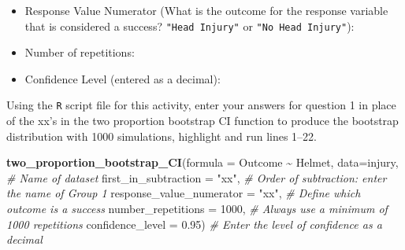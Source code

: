 \documentclass[
]{report}
\newenvironment{Shaded}{\begin{snugshade}}{\end{snugshade}}
\newcommand{\CommentTok}[1]{\textcolor[rgb]{0.56,0.35,0.01}{\textit{#1}}}
\newcommand{\DataTypeTok}[1]{\textcolor[rgb]{0.13,0.29,0.53}{#1}}
\newcommand{\DecValTok}[1]{\textcolor[rgb]{0.00,0.00,0.81}{#1}}
\newcommand{\FloatTok}[1]{\textcolor[rgb]{0.00,0.00,0.81}{#1}}
\newcommand{\KeywordTok}[1]{\textcolor[rgb]{0.13,0.29,0.53}{\textbf{#1}}}
\newcommand{\NormalTok}[1]{#1}
\newcommand{\OperatorTok}[1]{\textcolor[rgb]{0.81,0.36,0.00}{\textbf{#1}}}
\newcommand{\StringTok}[1]{\textcolor[rgb]{0.31,0.60,0.02}{#1}}
\providecommand{\tightlist}{%
  \setlength{\itemsep}{0pt}\setlength{\parskip}{0pt}}
\begin{document}
\vspace{.2in}

\begin{itemize}
\tightlist
\item
  Response Value Numerator (What is the outcome for the response variable that is considered a success? \texttt{"Head\ Injury"} or \texttt{"No\ Head\ Injury"}):
\end{itemize}

\vspace{.2in}

\begin{itemize}
\tightlist
\item
  Number of repetitions:
\end{itemize}

\vspace{.2in}

\begin{itemize}
\tightlist
\item
  Confidence Level (entered as a decimal):
\end{itemize}

\vspace{.2in}

Using the \texttt{R} script file for this activity, enter your answers for question 1 in place of the xx's in the two proportion bootstrap CI function to produce the bootstrap distribution with 1000 simulations, highlight and run lines 1--22.

\begin{Shaded}
\begin{Highlighting}[]
\KeywordTok{two\_proportion\_bootstrap\_CI}\NormalTok{(}\DataTypeTok{formula =}\NormalTok{ Outcome }\OperatorTok{\textasciitilde{}}\StringTok{ }\NormalTok{Helmet, }
                            \DataTypeTok{data=}\NormalTok{injury, }\CommentTok{\# Name of dataset}
                            \DataTypeTok{first\_in\_subtraction =} \StringTok{"xx"}\NormalTok{, }\CommentTok{\# Order of subtraction: enter the name of Group 1}
                            \DataTypeTok{response\_value\_numerator =} \StringTok{"xx"}\NormalTok{, }\CommentTok{\# Define which outcome is a success }
                            \DataTypeTok{number\_repetitions =} \DecValTok{1000}\NormalTok{, }\CommentTok{\# Always use a minimum of 1000 repetitions}
                            \DataTypeTok{confidence\_level =} \FloatTok{0.95}\NormalTok{) }\CommentTok{\# Enter the level of confidence as a decimal}
\end{Highlighting}
\end{Shaded}
\end{document}
